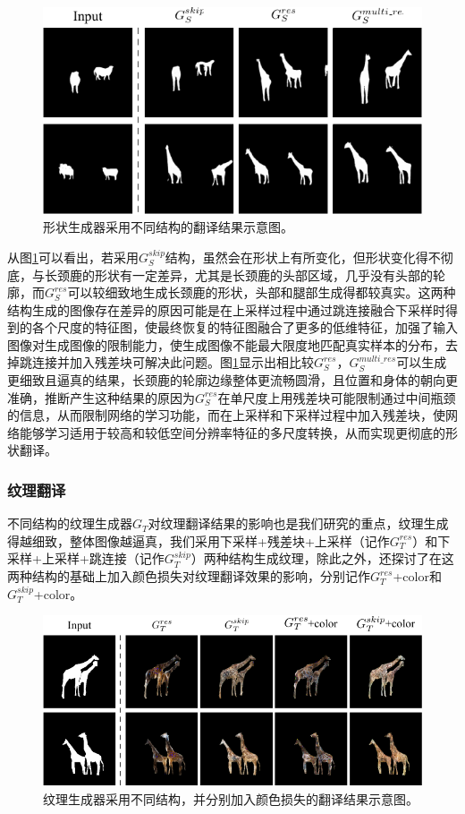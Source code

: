 \begin{figure}[ht]
    \centering
  \includegraphics[width=.8\textwidth]{figs/ablation_study_shape.pdf}
  \caption{形状生成器采用不同结构的翻译结果示意图。}
  \label{fig:ablation_study_shape}
\end{figure}

从图\ref{fig:ablation_study_shape}可以看出，若采用$G_S^{skip}$结构，虽然会在形状上有所变化，但形状变化得不彻底，与长颈鹿的形状有一定差异，尤其是长颈鹿的头部区域，几乎没有头部的轮廓，而$G_S^{res}$可以较细致地生成长颈鹿的形状，头部和腿部生成得都较真实。这两种结构生成的图像存在差异的原因可能是在上采样过程中通过跳连接融合下采样时得到的各个尺度的特征图，使最终恢复的特征图融合了更多的低维特征，加强了输入图像对生成图像的限制能力，使生成图像不能最大限度地匹配真实样本的分布，去掉跳连接并加入残差块可解决此问题。图\ref{fig:ablation_study_shape}显示出相比较$G_S^{res}$，$G_S^{multi\_res}$可以生成更细致且逼真的结果，长颈鹿的轮廓边缘整体更流畅圆滑，且位置和身体的朝向更准确，推断产生这种结果的原因为$G_S^{res}$在单尺度上用残差块可能限制通过中间瓶颈的信息，从而限制网络的学习功能，而在上采样和下采样过程中加入残差块，使网络能够学习适用于较高和较低空间分辨率特征的多尺度转换，从而实现更彻底的形状翻译。

\subsubsection{纹理翻译}

不同结构的纹理生成器$G_T$对纹理翻译结果的影响也是我们研究的重点，纹理生成得越细致，整体图像越逼真，我们采用下采样+残差块+上采样（记作$G_T^{res}$）和下采样+上采样+跳连接（记作$G_T^{skip}$）两种结构生成纹理，除此之外，还探讨了在这两种结构的基础上加入颜色损失对纹理翻译效果的影响，分别记作$G_T^{res}$+color和$G_T^{skip}$+color。

\begin{figure}[ht]
    \centering
  \includegraphics[width=\textwidth]{figs/ablation_study_texture.pdf}
  \caption{纹理生成器采用不同结构，并分别加入颜色损失的翻译结果示意图。}
  \label{fig:ablation_study_texture}
\end{figure}

